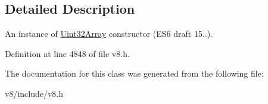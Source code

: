 \subsection{Detailed Description}
An instance of \mbox{\hyperlink{classv8_1_1Uint32Array}{Uint32\+Array}} constructor (E\+S6 draft 15..). 

Definition at line 4848 of file v8.\+h.



The documentation for this class was generated from the following file\+:\begin{DoxyCompactItemize}
\item 
v8/include/v8.\+h\end{DoxyCompactItemize}
